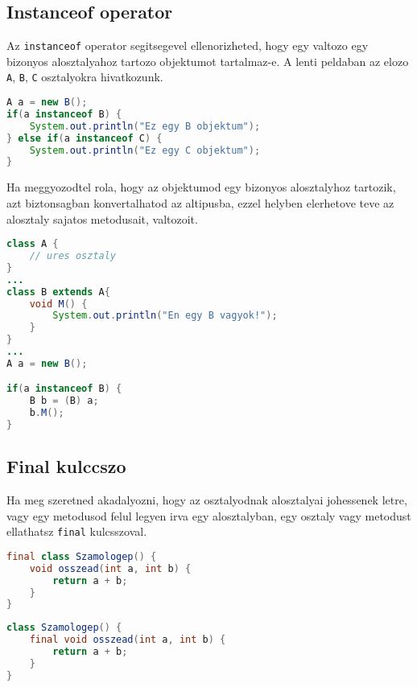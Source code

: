 \documentclass{article}
\let\l\lstinline
\begin{document}
\newpage

\subsection{Instanceof operator}

Az \l{instanceof} operator segitsegevel ellenorizheted, hogy egy valtozo egy bizonyos alosztalyahoz tartozo objektumot tartalmaz-e. A lenti peldaban az elozo \l{A}, \l{B}, \l{C} osztalyokra hivatkozunk.

\begin{lstlisting}[language=Java, caption=Instanceof hasznalata]
A a = new B();
if(a instanceof B) {
    System.out.println("Ez egy B objektum");
} else if(a instanceof C) {
    System.out.println("Ez egy C objektum");
}
\end{lstlisting}

Ha meggyozodtel rola, hogy az objektumod egy bizonyos alosztalyhoz tartozik, azt biztonsagban konvertalhatod az altipusba, ezzel helyben elerhetove teve az alosztaly sajatos metodusait, valtozoit.

\begin{lstlisting}[language=Java, caption=Instanceof hasznalata]
class A {
    // ures osztaly
}
...
class B extends A{
    void M() {
        System.out.println("En egy B vagyok!");
    }
}
...
A a = new B();

if(a instanceof B) {
    B b = (B) a;
    b.M();
}
\end{lstlisting}

\newpage

\subsection{Final kulccszo}

Ha meg szeretned akadalyozni, hogy az osztalyodnak alosztalyai johessenek letre, vagy egy metodusod felul legyen irva egy alosztalyban, egy osztaly vagy metodust ellathatsz \l{final} kulcsszoval.

\begin{lstlisting}[language=Java, caption=Final osztaly amit nem lehet kiboviteni]
final class Szamologep() {
    void osszead(int a, int b) {
        return a + b;
    }
}
\end{lstlisting}

\begin{lstlisting}[language=Java, caption=Osztaly aminek lehet alosztalya, de az osszead metodusat nem lehet felulirni]
class Szamologep() {
    final void osszead(int a, int b) {
        return a + b;
    }
}
\end{lstlisting}
\end{document}
